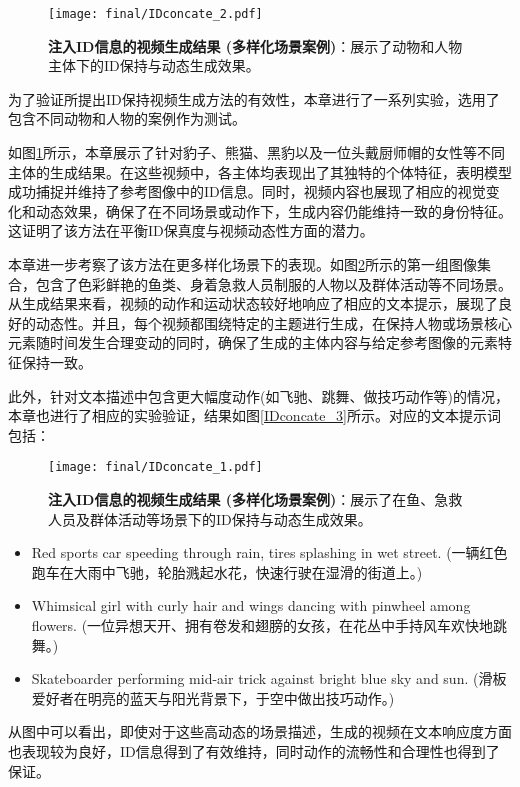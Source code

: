 \begin{figure}[htbp]
    \centering
    \texttt{[image: final/IDconcate\_2.pdf]}
    \caption{\textbf{注入ID信息的视频生成结果 (多样化场景案例)}：展示了动物和人物主体下的ID保持与动态生成效果。}
    \label{IDconcate_2}
\end{figure}


为了验证所提出ID保持视频生成方法的有效性，本章进行了一系列实验，选用了包含不同动物和人物的案例作为测试。

如图\ref{IDconcate_2}所示，本章展示了针对豹子、熊猫、黑豹以及一位头戴厨师帽的女性等不同主体的生成结果。在这些视频中，各主体均表现出了其独特的个体特征，表明模型成功捕捉并维持了参考图像中的ID信息。同时，视频内容也展现了相应的视觉变化和动态效果，确保了在不同场景或动作下，生成内容仍能维持一致的身份特征。这证明了该方法在平衡ID保真度与视频动态性方面的潜力。

本章进一步考察了该方法在更多样化场景下的表现。如图\ref{IDconcate_1}所示的第一组图像集合，包含了色彩鲜艳的鱼类、身着急救人员制服的人物以及群体活动等不同场景。从生成结果来看，视频的动作和运动状态较好地响应了相应的文本提示，展现了良好的动态性。并且，每个视频都围绕特定的主题进行生成，在保持人物或场景核心元素随时间发生合理变动的同时，确保了生成的主体内容与给定参考图像的元素特征保持一致。

此外，针对文本描述中包含更大幅度动作(如飞驰、跳舞、做技巧动作等)的情况，本章也进行了相应的实验验证，结果如图\ref{IDconcate_3}所示。对应的文本提示词包括：

\begin{figure}[htbp]
    \centering
    \texttt{[image: final/IDconcate\_1.pdf]}
    \caption{\textbf{注入ID信息的视频生成结果 (多样化场景案例)}：展示了在鱼、急救人员及群体活动等场景下的ID保持与动态生成效果。}
    \label{IDconcate_1}
\end{figure}

\begin{itemize}
\item Red sports car speeding through rain, tires splashing in wet street. (一辆红色跑车在大雨中飞驰，轮胎溅起水花，快速行驶在湿滑的街道上。)
\item Whimsical girl with curly hair and wings dancing with pinwheel among flowers. (一位异想天开、拥有卷发和翅膀的女孩，在花丛中手持风车欢快地跳舞。)
\item Skateboarder performing mid-air trick against bright blue sky and sun. (滑板爱好者在明亮的蓝天与阳光背景下，于空中做出技巧动作。)
\end{itemize}
从图中可以看出，即使对于这些高动态的场景描述，生成的视频在文本响应度方面也表现较为良好，ID信息得到了有效维持，同时动作的流畅性和合理性也得到了保证。

